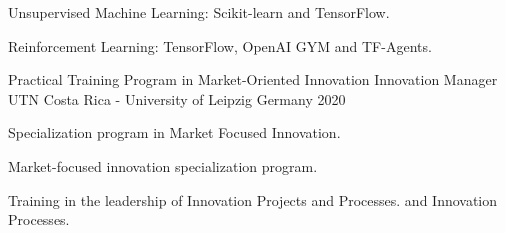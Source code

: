 \begin{cventries}
{\begin{cvitems}
        \item Unsupervised Machine Learning: Scikit-learn and TensorFlow.
        \item Reinforcement Learning: TensorFlow, OpenAI GYM and TF-Agents.
      \end{cvitems}
    }
  \cventry
  {Practical Training Program in Market-Oriented Innovation} %
  {Innovation Manager} %
    {UTN Costa Rica - University of Leipzig Germany} %
    {2020} %
    {
      \begin{cvitems} %
        \item Specialization program in Market Focused Innovation.
        \item Market-focused innovation specialization program.
        \item Training in the leadership of Innovation Projects and Processes.
        and Innovation Processes.
      \end{cvitems}
    }

\end{cventries}
